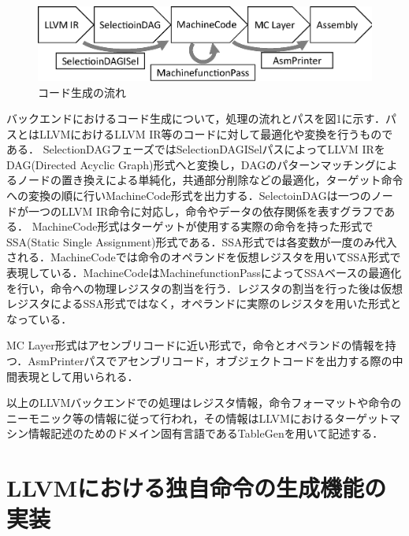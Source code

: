 ﻿\documentclass[a4j]{jarticle}
\begin{document}
\begin{figure}[t]
    \centering
    \includegraphics[scale=0.35]{backend_mojideka_2.eps}
    \vspace{-3truemm}
    \caption{コード生成の流れ}
    \vspace{-4truemm}
    \label{fig:backend}
\end{figure}

バックエンドにおけるコード生成について，処理の流れとパスを図1に示す．パスとはLLVMにおけるLLVM IR等のコードに対して最適化や変換を行うものである．
SelectionDAGフェーズではSelectionDAGISelパスによってLLVM IRをDAG(Directed Acyclic Graph)形式へと変換し，DAGのパターンマッチングによるノードの置き換えによる単純化，共通部分削除などの最適化，ターゲット命令への変換の順に行いMachineCode形式を出力する．SelectoinDAGは一つのノードが一つのLLVM IR命令に対応し，命令やデータの依存関係を表すグラフである．
MachineCode形式はターゲットが使用する実際の命令を持った形式でSSA(Static Single Assignment)形式である．SSA形式では各変数が一度のみ代入される．MachineCodeでは命令のオペランドを仮想レジスタを用いてSSA形式で表現している．MachineCodeはMachinefunctionPassによってSSAベースの最適化を行い，命令への物理レジスタの割当を行う．レジスタの割当を行った後は仮想レジスタによるSSA形式ではなく，オペランドに実際のレジスタを用いた形式となっている．

MC Layer形式はアセンブリコードに近い形式で，命令とオペランドの情報を持つ．AsmPrinterパスでアセンブリコード，オブジェクトコードを出力する際の中間表現として用いられる．

以上のLLVMバックエンドでの処理はレジスタ情報，命令フォーマットや命令のニーモニック等の情報に従って行われ，その情報はLLVMにおけるターゲットマシン情報記述のためのドメイン固有言語であるTableGenを用いて記述する．



\section{LLVMにおける独自命令の生成機能の実装}
\end{document}
